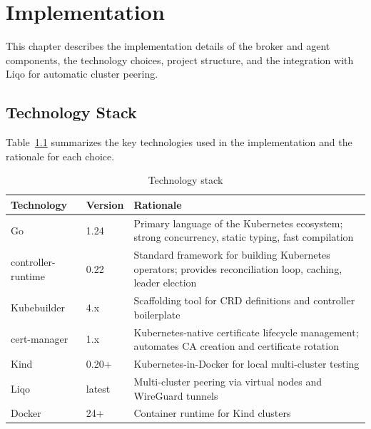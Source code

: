 
\chapter{Implementation}
\label{ch:implementation}

This chapter describes the implementation details of the broker and agent components, the technology choices, project structure, and the integration with Liqo for automatic cluster peering.


\section{Technology Stack}
\label{sec:tech-stack}

Table~\ref{tab:tech-stack} summarizes the key technologies used in the implementation and the rationale for each choice.

\begin{table}[htbp]
\centering
\caption{Technology stack}
\label{tab:tech-stack}
\begin{tabular}{@{}llp{6.5cm}@{}}
\toprule
\textbf{Technology} & \textbf{Version} & \textbf{Rationale} \\
\midrule
Go & 1.24 & Primary language of the Kubernetes ecosystem; strong concurrency, static typing, fast compilation \\
controller-runtime & 0.22 & Standard framework for building Kubernetes operators; provides reconciliation loop, caching, leader election \\
Kubebuilder & 4.x & Scaffolding tool for CRD definitions and controller boilerplate \\
cert-manager & 1.x & Kubernetes-native certificate lifecycle management; automates CA creation and certificate rotation \\
Kind & 0.20+ & Kubernetes-in-Docker for local multi-cluster testing \\
Liqo & latest & Multi-cluster peering via virtual nodes and WireGuard tunnels \\
Docker & 24+ & Container runtime for Kind clusters \\
\bottomrule
\end{tabular}
\end{table}


